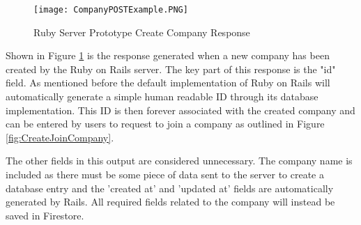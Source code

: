 \begin{figure}[ht]
  \centering
      \texttt{[image: CompanyPOSTExample.PNG]}
  \caption[Ruby Server Prototype Create Company Response]{Ruby Server Prototype Create Company Response}
  \label{fig:CompanyPOST}
\end{figure}

Shown in Figure \ref{fig:CompanyPOST} is the response generated when a new company has been created by the Ruby on Rails server. The key part of this response is the "id" field. As mentioned before the default implementation of Ruby on Rails will automatically generate a simple human readable ID through its database implementation. This ID is then forever associated with the created company and can be entered by users to request to join a company as outlined in Figure \ref{fig:CreateJoinCompany}.

The other fields in this output are considered unnecessary. The company name is included as there must be some piece of data sent to the server to create a database entry and the 'created at' and 'updated at' fields are automatically generated by Rails. All required fields related to the company will instead be saved in Firestore.
